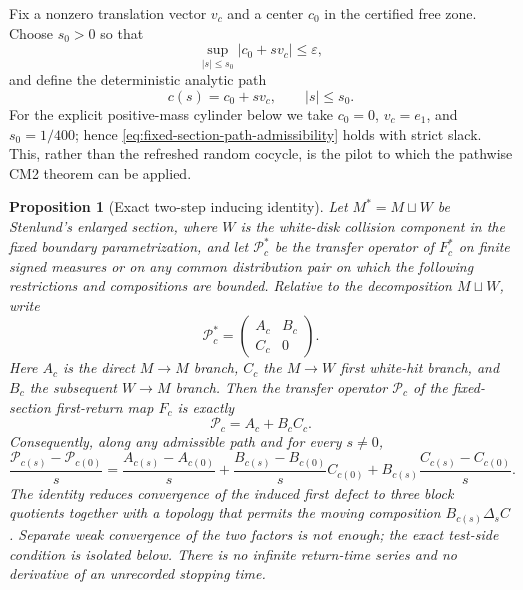 \documentclass[11pt]{article}
\newtheorem{proposition}[theorem]{Proposition}
\begin{document}
Fix a nonzero translation vector $v_c$ and a center $c_0$ in the certified
free zone.  Choose $s_0>0$ so that
\begin{equation}
 \sup_{|s|\le s_0}|c_0+sv_c|\le\varepsilon,
\label{eq:fixed-section-path-admissibility}
\end{equation}
and define the deterministic analytic path
\begin{equation}
 c(s)=c_0+sv_c,\qquad |s|\le s_0.
\label{eq:fixed-section-deterministic-path}
\end{equation}
For the explicit positive-mass cylinder below we take
$c_0=0$, $v_c=e_1$, and $s_0=1/400$; hence
\eqref{eq:fixed-section-path-admissibility} holds with strict slack.
This, rather than the refreshed random cocycle, is the pilot to which the
pathwise CM2 theorem can be applied.

\begin{proposition}[Exact two-step inducing identity]
\label{prop:fixed-section-two-step-inducing}
Let $M^*=M\sqcup W$ be Stenlund's enlarged section, where $W$ is the white-disk
collision component in the fixed boundary parametrization, and let
$\mathcal P_c^*$ be the transfer operator of $F_c^*$ on finite signed measures
or on any common distribution pair on which the following restrictions and
compositions are bounded.  Relative to the decomposition $M\sqcup W$, write
\begin{equation}
 \mathcal P_c^*=\begin{pmatrix}A_c&B_c\\ C_c&0\end{pmatrix}.
\label{eq:fixed-section-enlarged-block-operator}
\end{equation}
Here $A_c$ is the direct $M\to M$ branch, $C_c$ the $M\to W$ first white-hit
branch, and $B_c$ the subsequent $W\to M$ branch.  Then the transfer operator
$\mathcal P_c$ of the fixed-section first-return map $F_c$ is exactly
\begin{equation}
 \mathcal P_c=A_c+B_cC_c.
\label{eq:fixed-section-induced-operator}
\end{equation}
Consequently, along any admissible path and for every $s\ne0$,
\begin{equation}
 \frac{\mathcal P_{c(s)}-\mathcal P_{c(0)}}s
 =\frac{A_{c(s)}-A_{c(0)}}s
  +\frac{B_{c(s)}-B_{c(0)}}sC_{c(0)}
  +B_{c(s)}\frac{C_{c(s)}-C_{c(0)}}s.
\label{eq:fixed-section-induced-DQ}
\end{equation}
The identity reduces convergence of the induced first defect to three block
quotients together with a topology that permits the moving composition
$B_{c(s)}\Delta_sC$.  Separate weak convergence of the two factors is not
enough; the exact test-side condition is isolated below.  There is no
infinite return-time series and no derivative of an unrecorded stopping time.
\end{proposition}
\end{document}
